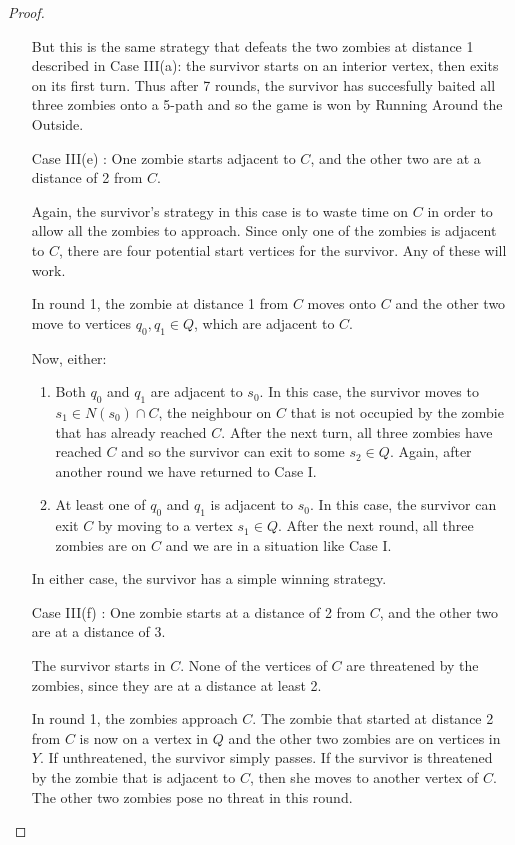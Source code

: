 \begin{proof}
\begin{enumerate}[I.]
But this is the same strategy that defeats the two zombies at distance 1 described in Case III(a): the survivor starts on an interior vertex, then exits on its first turn.
Thus after 7 rounds, the survivor has succesfully baited all three zombies onto a 5-path and so the game is won by Running Around the Outside.

\item[Case III(e)]: One zombie starts adjacent to $C$, and the other two are at a distance of 2 from $C$.

Again, the survivor's strategy in this case is to waste time on $C$ in order to allow all the zombies to approach. Since only one of the
zombies is adjacent to $C$, there are four potential start vertices for the survivor. Any of these will work.

In round 1, the zombie at distance 1 from $C$ moves onto $C$ and the other two move to vertices $q_0, q_1 \in Q$,
which are adjacent to $C$.

Now, either:

\begin{enumerate}
\item Both $q_0$ and $q_1$ are adjacent to $s_0$. In this case, the survivor moves to $s_1 \in N(s_0) \cap C$, the neighbour on $C$ that is not occupied
by the zombie that has already reached $C$. After the next turn, all three zombies have reached $C$ and so the survivor can
exit to some $s_2 \in Q$. Again, after another round we have returned to Case I.

\item At least one of $q_0$ and $q_1$ is adjacent to $s_0$. In this case, the survivor can exit $C$ by moving to a vertex $s_1 \in Q$. After the next
round, all three zombies are on $C$ and we are in a situation like Case I.
\end{enumerate}

In either case, the survivor has a simple winning strategy.

\item[Case III(f)]: One zombie starts at a distance of 2 from $C$, and the other two are at a distance of 3.

The survivor starts in $C$. None of the vertices of $C$ are threatened by the zombies, since they are at a distance at least 2.

In round 1, the zombies approach $C$. The zombie that started at distance 2 from $C$ is now on a vertex in $Q$ and the other two
zombies are on vertices in $Y$. If unthreatened, the survivor simply passes.
If the survivor is threatened by the zombie that is adjacent to $C$, then she moves to another vertex of $C$. The other two zombies
pose no threat in this round.


\end{enumerate}
\end{proof}
